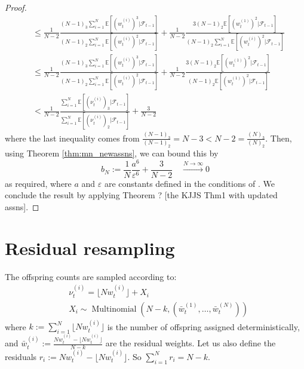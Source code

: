 \documentclass[fleqn]{article}
\theoremstyle{definition}
\newcommand{\E}{\mathbb{E}}
\newcommand{\Ntoinfty}{\overset{N\to\infty}{\longrightarrow}}
\newcommand{\Mn}{\operatorname{Multinomial}}
\newcommand{\F}{\mathcal{F}_{t-1}}
\newcommand{\vt}[2][t]{\nu_{#1}^{(#2)}}
\newcommand{\wt}[2][t]{w_{#1}^{(#2)}}
\newcommand{\wbar}[2][t]{\bar{w}_{#1}^{(#2)}}
\begin{document}
\begin{proof}
\begin{align*}
&\leq \frac{1}{N-2} \frac{(N-1)_3 \sum_{i=1}^{N} \E[(\wt{i})^3 |\F]}{(N-1)_2 \sum_{i=1}^{N} \E[(\wt{i})^2 |\F]} + \frac{1}{N-2} \frac{3(N-1)_2 \E[(\wt{1})^2 |\F]}{(N-1)_2 \sum_{i=1}^{N} \E[(\wt{i})^2 |\F]} \\
&\leq \frac{1}{N-2} \frac{(N-1)_3 \sum_{i=1}^{N} \E[(\wt{i})^3 |\F]}{(N-1)_2 \sum_{i=1}^{N} \E[(\wt{i})^2 |\F]} + \frac{1}{N-2} \frac{3(N-1)_2 \E[(\wt{1})^2 |\F]}{(N-1)_2 \E[(\wt{1})^2 |\F]} \\
&<  \frac{1}{N-2} \frac{\sum_{i=1}^{N} \E[(\vt{i})_3 |\F]}{\sum_{i=1}^{N} \E[(\vt{i})_2 |\F]} + \frac{3}{N-2}
\end{align*}
where the last inequality comes from $\frac{(N-1)_3}{(N-1)_2} = N-3 < N-2 = \frac{(N)_3}{(N)_2}$.
Then, using Theorem \ref{thm:mn_newassns}, we can bound this by
\begin{equation*}
b_N := \frac{1}{N}\frac{a^6}{\varepsilon^6} + \frac{3}{N-2} \quad \Ntoinfty 0
\end{equation*}
as required, where $a$ and $\varepsilon$ are constants defined in the conditions of \citet[Lemma 3]{koskela2018}.
We conclude the result by applying Theorem ? [the KJJS Thm1 with updated assns].
\end{proof}


\section{Residual resampling}
The offspring counts are sampled according to:
\begin{align*}
& \vt{i} = \lfloor N \wt{i} \rfloor + X_i \\
& X_i \sim \Mn (N-k, (\wbar{1}, \dots, \wbar{N}))
\end{align*}
where $k := \sum_{i=1}^N \lfloor N \wt{i} \rfloor$ is the number of offspring assigned deterministically, and $\wbar{i} := \frac{N\wt{i} - \lfloor N \wt{i} \rfloor}{N - k}$ are the residual weights. Let us also define the residuals $r_i := N\wt{i} - \lfloor N \wt{i} \rfloor$. So $\sum_{i=1}^N r_i = N-k$.
\end{document}
